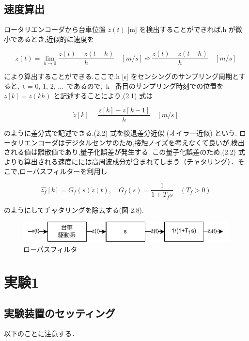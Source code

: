 \subsection{速度算出}

ロータリエンコーダから台車位置 \( z(t) \) [m] を検出することができれば,h が微小であるとき,近似的に速度を

\begin{equation}
  \dot{z}(t) = \lim_{h \to 0} \frac{z(t) - z(t-h)}{h} \quad [m/s] \backsimeq  \frac{z(t) - z(t-h)}{h} \quad [m/s]
\end{equation}

により算出することができる.ここで,h [s] をセンシングのサンプリング周期とすると,\ t = 0, 1, 2, ... \,であるので,\ k \  番目のサンプリング時刻での位置を \( z[k] = z(kh) \) と記述することにより,(2.1) 式は

\begin{equation}
  \dot{z}[k] = \frac{z[k] - z[k-1]}{h} \quad [m/s]
\end{equation}

のように差分式で記述できる.(2.2) 式を後退差分近似 (オイラー近似) という.
ロータリエンコーダはデジタルセンサのため,接触ノイズを考えなくて良いが,検出される値は離散値であり,量子化誤差が発生する.
この量子化誤差のため,(2.2) 式よりも算出される速度にには高周波成分が含まれてしまう（チャタリング）．そこで,ローパスフィルターを利用し

\begin{equation}
  \hat{z_f}[k] = G_f(s) \dot{z}(t), \quad G_f(s) = \frac{1}{1 + T_f s} \quad (T_f > 0)
\end{equation}

のようにしてチャタリングを除去する(図 2.8).

\begin{figure}[H]
  \centering
  \includegraphics[scale=1]{sozai/ro-pasufiruta.pdf}
  \caption{ローパスフィルタ}
\end{figure}

\newpage

\section{実験1}

\subsection{実験装置のセッティング}
\noindent
以下のことに注意する．

